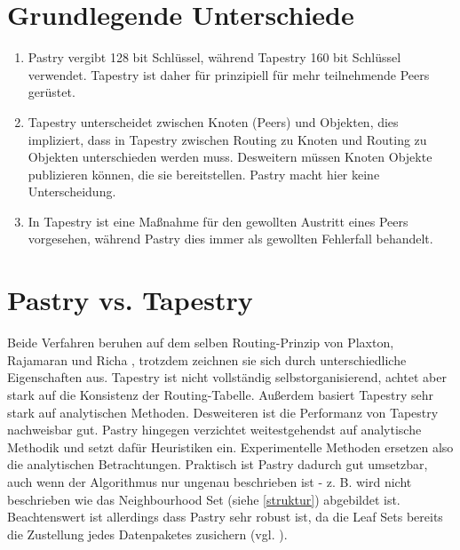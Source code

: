 
\section{Grundlegende Unterschiede}
\begin{enumerate}
  \item Pastry vergibt 128 bit Schlüssel, während Tapestry 160 bit Schlüssel
  verwendet. Tapestry ist daher für prinzipiell für mehr teilnehmende Peers
  gerüstet.
  \item Tapestry unterscheidet zwischen Knoten (Peers) und Objekten, dies
  impliziert, dass in Tapestry zwischen Routing zu Knoten und Routing zu
  Objekten unterschieden werden muss. Desweitern müssen Knoten Objekte
  publizieren können, die sie bereitstellen. Pastry macht hier keine
  Unterscheidung.
  \item In Tapestry ist eine Maßnahme für den gewollten Austritt eines Peers
  vorgesehen, während Pastry dies immer als gewollten Fehlerfall behandelt.
\end{enumerate}

\section{Pastry vs. Tapestry}
Beide Verfahren beruhen auf dem selben Routing-Prinzip von Plaxton, Rajamaran
und Richa \cite{PlaxtonRR97}, trotzdem zeichnen sie sich durch unterschiedliche Eigenschaften aus.
\newline \newline
Tapestry ist nicht vollständig selbstorganisierend, achtet aber stark auf die
Konsistenz der Routing-Tabelle. Außerdem basiert Tapestry sehr stark auf
analytischen Methoden. Desweiteren ist die Performanz von Tapestry nachweisbar
gut. 
\newline \newline
Pastry hingegen verzichtet weitestgehendst auf analytische Methodik und
setzt dafür Heuristiken ein. Experimentelle Methoden ersetzen also die
analytischen Betrachtungen. Praktisch ist Pastry dadurch gut umsetzbar, auch
wenn der Algorithmus nur ungenau beschrieben ist - z. B. wird nicht beschrieben
wie das Neighbourhood Set (siehe \ref{struktur}) abgebildet ist. Beachtenswert
ist allerdings dass Pastry sehr robust ist, da die Leaf Sets bereits die
Zustellung jedes Datenpaketes zusichern (vgl. \cite{Schindelhauer2004}).
 

